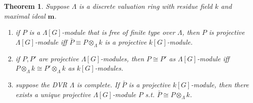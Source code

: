 \documentclass[12pt,letterpaper]{report}
\newtheorem{theorem}{Theorem}[section]
\begin{document}
\begin{theorem}Suppose $\Lambda$ is a discrete valuation ring with residue field $k$ and maximal ideal $\mathbf{m}$. 
\begin{enumerate}\item if $P$ is a $\Lambda[G]$-module that is free of finite type over $\Lambda$, then $P$ is projective $\Lambda[G]$-module iff $\bar{P}\equiv P\otimes_{\Lambda}k$ is a projective $k[G]$-module.\item if $P,P'$ are projective $\Lambda[G]$-modules, then $P\cong P'$ as $\Lambda[G]$-module iff $P\otimes_{\Lambda}k\cong P'\otimes_{\Lambda}k$ as $k[G]$-modules.\item suppose the DVR $\Lambda$ is complete. If $\bar{P}$ is a projective $k[G]$-module, then there exists a unique projective $\Lambda[G]$-module $P$ s.t. $\bar{P}\cong P\otimes_{\Lambda}k$.\end{enumerate}\end{theorem}
\end{document}
